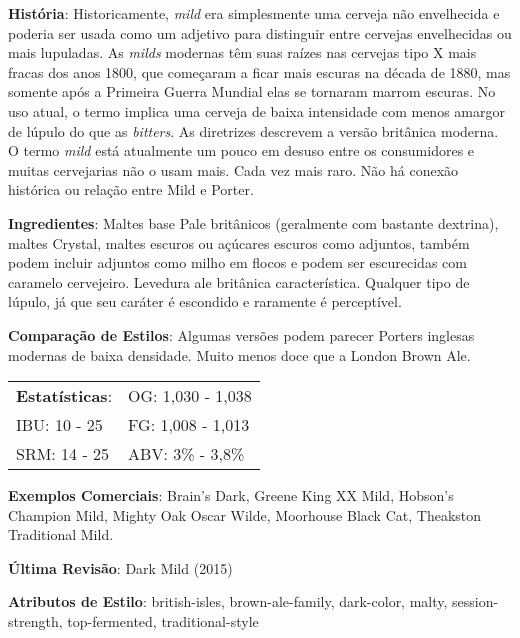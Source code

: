 \textbf{História}: Historicamente, \textit{mild} era simplesmente uma cerveja não envelhecida e poderia ser usada como um adjetivo para distinguir entre cervejas envelhecidas ou mais lupuladas. As \textit{milds} modernas têm suas raízes nas cervejas tipo X mais fracas dos anos 1800, que começaram a ficar mais escuras na década de 1880, mas somente após a Primeira Guerra Mundial elas se tornaram marrom escuras. No uso atual, o termo implica uma cerveja de baixa intensidade com menos amargor de lúpulo do que as \textit{bitters}. As diretrizes descrevem a versão britânica moderna. O termo \textit{mild} está atualmente um pouco em desuso entre os consumidores e muitas cervejarias não o usam mais. Cada vez mais raro. Não há conexão histórica ou relação entre Mild e Porter.

\textbf{Ingredientes}: Maltes base Pale britânicos (geralmente com bastante dextrina), maltes Crystal, maltes escuros ou açúcares escuros como adjuntos, também podem incluir adjuntos como milho em flocos e podem ser escurecidas com caramelo cervejeiro. Levedura ale britânica característica. Qualquer tipo de lúpulo, já que seu caráter é escondido e raramente é perceptível.

\textbf{Comparação de Estilos}: Algumas versões podem parecer Porters inglesas modernas de baixa densidade. Muito menos doce que a London Brown Ale.

\begin{tabular}{@{}p{35mm}p{35mm}@{}}
  \textbf{Estatísticas}: & OG: 1,030 - 1,038 \\
  IBU: 10 - 25  & FG: 1,008 - 1,013  \\
  SRM: 14 - 25  & ABV: 3\% - 3,8\%
\end{tabular}

\textbf{Exemplos Comerciais}: Brain's Dark, Greene King XX Mild, Hobson's Champion Mild, Mighty Oak Oscar Wilde, Moorhouse Black Cat, Theakston Traditional Mild.

\textbf{Última Revisão}: Dark Mild (2015)

\textbf{Atributos de Estilo}: british-isles, brown-ale-family, dark-color, malty, session-strength, top-fermented, traditional-style
